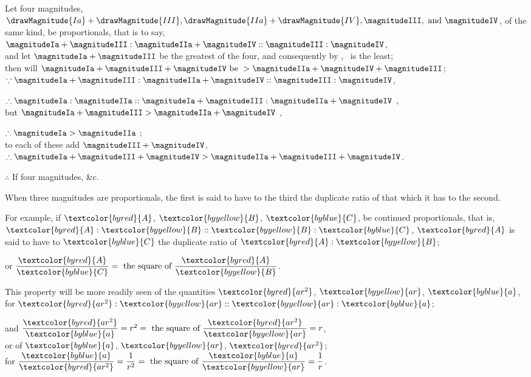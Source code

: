 \documentclass[booklanguage=english]{byrnebook}
\begin{document}
\begin{center}
Let four magnitudes, $\drawMagnitude{Ia} + \drawMagnitude{III}, \drawMagnitude{IIa} + \drawMagnitude{IV}, \magnitudeIII, \mbox{ and } \magnitudeIV$, of the same kind, be proportionals, that is to say,\\
$\magnitudeIa + \magnitudeIII : \magnitudeIIa + \magnitudeIV :: \magnitudeIII : \magnitudeIV$,\\
and let $\magnitudeIa + \magnitudeIII$ be the greatest of the four, and consequently by , \magnitudeIV\ is the least;\\
then will $\magnitudeIa + \magnitudeIII + \magnitudeIV \mbox{ be } > \magnitudeIIa + \magnitudeIV + \magnitudeIII$;\\
$\because \magnitudeIa + \magnitudeIII : \magnitudeIIa + \magnitudeIV :: \magnitudeIII : \magnitudeIV$, %

$\therefore \magnitudeIa : \magnitudeIIa :: \magnitudeIa + \magnitudeIII : \magnitudeIIa + \magnitudeIV$ ,\\
but $\magnitudeIa + \magnitudeIII > \magnitudeIIa + \magnitudeIV$ \byref{\hypref},

$\therefore \magnitudeIa > \magnitudeIIa$ ;\\
to each of these add $\magnitudeIII + \magnitudeIV$,\\
$\therefore \magnitudeIa + \magnitudeIII + \magnitudeIV > \magnitudeIIa + \magnitudeIII + \magnitudeIV$.

$\therefore$ If four magnitudes, \&c.
\end{center}

\vfill\pagebreak

\label{def:V.X} 
\def\varA{\textcolor{byred}{A}}
\def\varB{\textcolor{byyellow}{B}}
\def\varC{\textcolor{byblue}{C}}
\def\vararS{\textcolor{byred}{ar^2}}
\def\varar{\textcolor{byyellow}{ar}}
\def\vara{\textcolor{byblue}{a}}
When three magnitudes are proportionals, the first is said to have to the third the duplicate ratio of that which it has to the second.

For example, if $\varA$, $\varB$, $\varC$, be continued proportionals, that is, $\varA : \varB :: \varB : \varC$, $\varA$ is said to have to $\varC$ the duplicate ratio of $\varA : \varB$;

\begin{center}
or $\dfrac{\varA}{\varC} = \mbox{ the square of } \dfrac{\varA}{\varB}$.

This property will be more readily seen of the quantities $\vararS$, $\varar$, $\vara$, for $\vararS : \varar :: \varar : \vara$;

and $\dfrac{\vararS}{\vara} = r^2 = \mbox{ the square of } \dfrac{\vararS}{\varar} = r$,\\
or of $\vara$, $\varar$, $\vararS$;\\
for $\dfrac{\vara}{\vararS} = \dfrac{1}{r^2} = \mbox{ the square of } \dfrac{\vara}{\varar} = \dfrac{1}{r}$.
\end{center}
\end{document}

